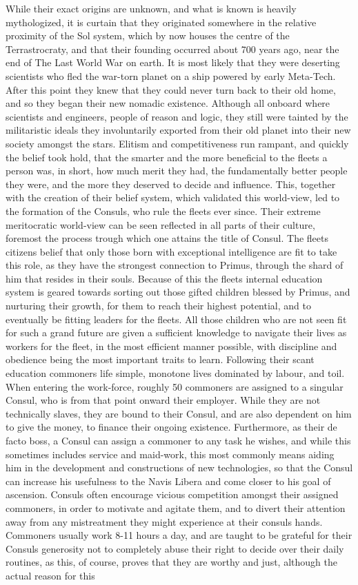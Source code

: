 \documentclass[a4paper,12pt]{report}
\begin{document}
While their exact origins are unknown, and what is known is heavily mythologized, it is curtain that they originated somewhere in the relative proximity of the Sol system, which by now houses the centre of the Terrastrocraty, and that their founding occurred about 700 years ago, near the end of The Last World War on earth. It is most likely that they were deserting scientists who fled the war-torn planet on a ship powered by early Meta-Tech. After this point they knew that they could never turn back to their old home, and so they began their new nomadic existence. Although all onboard where scientists and engineers, people of reason and logic, they still were tainted by the militaristic ideals they involuntarily exported from their old planet into their new society amongst the stars. Elitism and competitiveness run rampant, and quickly the belief took hold, that the smarter and the more beneficial to the fleets a person was, in short, how much merit they had, the fundamentally better people they were, and the more they deserved to decide and influence. This, together with the creation of their belief system, which validated this world-view, led to the formation of the Consuls, who rule the fleets ever since. Their extreme meritocratic world-view can be seen reflected in all parts of their culture, foremost the process trough which one attains the title of Consul. The fleets citizens belief that only those born with exceptional intelligence are fit to take this role, as they have the strongest connection to Primus, through the shard of him that resides in their souls. Because of this the fleets internal education system is geared towards sorting out those gifted children blessed by Primus, and nurturing their growth, for them to reach their highest potential, and to eventually be fitting leaders for the fleets. All those children who are not seen fit for such a grand future are given a sufficient knowledge to navigate their lives as workers for the fleet, in the most efficient manner possible, with discipline and obedience being the most important traits to learn. Following their scant education commoners life simple, monotone lives dominated by labour, and toil. When entering the work-force, roughly 50 commoners are assigned to a singular Consul, who is from that point onward their employer. While they are not technically slaves, they are bound to their Consul, and are also dependent on him to give the money, to finance their ongoing existence. Furthermore, as their de facto boss, a Consul can assign a commoner to any task he wishes, and while this sometimes includes service and maid-work, this most commonly means aiding him in the development and constructions of new technologies, so that the Consul can increase his usefulness to the Navis Libera and come closer to his goal of ascension. Consuls often encourage vicious competition amongst their assigned commoners, in order to motivate and agitate them, and to divert their attention away from any mistreatment they might experience at their consuls hands. Commoners usually work 8-11 hours a day, and are taught to be grateful for their Consuls generosity not to completely abuse their right to decide over their daily routines, as this, of course, proves that they are worthy and just, although the actual reason for this 
\end{document}
